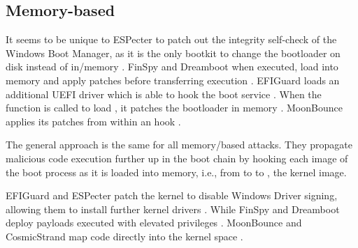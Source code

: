 \subsection{Memory-based}

It seems to be unique to ESPecter to patch out the integrity self-check of the Windows Boot Manager, as it is the only bootkit to change the bootloader on disk instead of in\-/memory \cite{especter}.
FinSpy and Dreamboot when executed, load  into memory and apply patches before transferring execution \cite{finspy, dreamboot}.
EFIGuard loads an additional \ac{UEFI} driver which is able to hook the boot service .
When the function is called to load , it patches the bootloader in memory \cite{efiguard}.
MoonBounce applies its patches from within an  hook \cite{moonbounce}.

The general approach is the same for all memory\-/based attacks.
They propagate malicious code execution further up in the boot chain by hooking each image of the boot process as it is loaded into memory, i.e., from  to  to , the kernel image.

EFIGuard and ESPecter patch the kernel to disable Windows Driver signing, allowing them to install further kernel drivers \cite{efiguard,especter}.
While FinSpy and Dreamboot deploy payloads executed with elevated privileges \cite{finspy,dreamboot}.
MoonBounce and CosmicStrand map code directly into the kernel space \cite{moonbounce,cosmicstrand}.